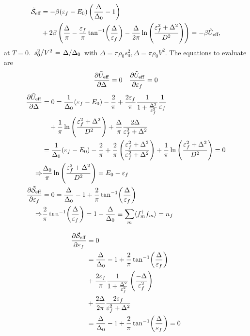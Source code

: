 \begin{align}
\begin{split}
	\tilde{\mathcal{S}}_{\text{eff}}&= -\beta(\varepsilon_f -E_0)\left(\frac{\Delta}{\Delta_0}-1\right) \\
	\quad &+2\beta\left(\frac{\Delta}{\pi} - \frac{\varepsilon_f}{\pi}\tan[-1](\frac{\Delta}{\varepsilon_f}) - \frac{\Delta}{2\pi}\ln\left(\frac{\varepsilon_f^2 + \Delta^2}{D^2}\right)\right) =-\beta\tilde{U}_\text{eff},
\end{split}
\end{align}
at $T = 0$. $\flatfrac{s_0^2}{V^2} = \flatfrac{\Delta}{\Delta_0}$ with $\Delta = \pi\rho_0 s_0^2, \Delta = \pi\rho_0 V^2$.
The equations to evaluate are
\begin{align*}
	\pdv{\tilde{U}_\text{eff}}{\Delta} = 0 &&
	\pdv{\tilde{U}_\text{eff}}{\varepsilon_f} = 0
\end{align*}
\begin{align*}
\pdv{\tilde{U}_\text{eff}}{\Delta} &= 0 = \frac{1}{\Delta_0}(\varepsilon_f - E_0) - \frac{2}{\pi} + \frac{2\varepsilon_f}{\pi}\frac{1}{1+\frac{\Delta^2}{\varepsilon_f^2}}\frac{1}{\varepsilon_f} \\
&\quad+ \frac{1}{\pi}\ln\left(\frac{\varepsilon_f^2 +\Delta^2}{D^2}\right) + \frac{\Delta}{\pi}\frac{2\Delta}{\varepsilon_f^2 + \Delta^2} \\
&= \frac{1}{\Delta_0}(\varepsilon_f-E_0)-\frac{2}{\pi} + \frac{2}{\pi}\left(\frac{\varepsilon_f^2 + \Delta^2}{\varepsilon_f^2+\Delta^2}\right) + \frac{1}{\pi}\ln\left(\frac{\varepsilon_f^2 +\Delta^2}{D^2}\right) = 0  \\
\Rightarrow &\frac{\Delta_0}{\pi}\ln\left(\frac{\varepsilon_f^2 + \Delta^2}{D^2}\right) = E_0 - \varepsilon_f \\
\pdv{\tilde{\mathcal{S}}_{\text{eff}}}{\varepsilon_f} &= 0 = \frac{\Delta}{\Delta_0} -1 +\frac{2}{\pi}\tan[-1](\frac{\Delta}{\varepsilon_f}) \\
\Rightarrow &
\frac{2}{\pi}\tan[-1](\frac{\Delta}{\varepsilon_f}) = 1-\frac{\Delta}{\Delta_0} \equiv \sum_m\langle f_m^\dagger f_m\rangle = n_f
\end{align*}

\begin{align*}
\pdv{\tilde{\mathcal{S}}_{\text{eff}}}{\varepsilon_f} &= 0 \\
&=\frac{\Delta}{\Delta_0} - 1+\frac{2}{\pi}\tan[-1](\frac{\Delta}{\varepsilon_f}) \\
\quad &+ \frac{2\varepsilon_f}{\pi}\frac{1}{1+\frac{\Delta^2}{\varepsilon_f^2}}\left(\frac{-\Delta}{\varepsilon_f^2}\right) \\
\quad &+ \frac{2\Delta}{2\pi}\frac{2\varepsilon_f}{\varepsilon_f^2 + \Delta^2} \\
&= \frac{\Delta}{\Delta_0} -1 +\frac{2}{\pi}\tan[-1](\frac{\Delta}{\varepsilon_f}) = 0
\end{align*}

